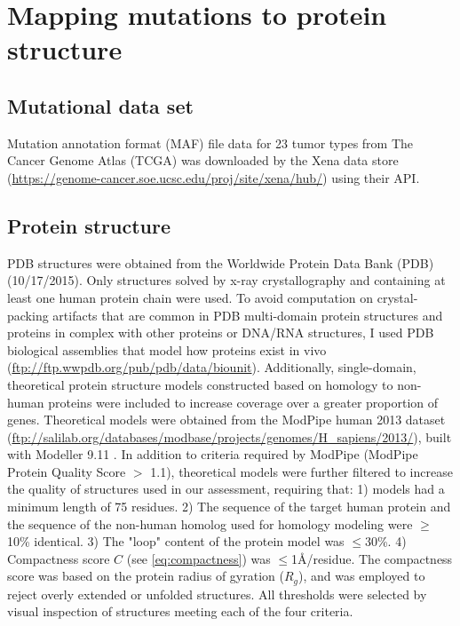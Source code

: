 \section{Mapping mutations to protein structure}

\subsection{Mutational data set}

Mutation annotation format (MAF) file data for 23 tumor types from The Cancer Genome Atlas (TCGA) was downloaded by the Xena data store (\url{https://genome-cancer.soe.ucsc.edu/proj/site/xena/hub/}) using their API.

\subsection{Protein structure}

PDB structures were obtained from the Worldwide Protein Data Bank (PDB) (10/17/2015). Only structures solved by x-ray crystallography and containing at least one human protein chain were used.  To avoid computation on crystal-packing artifacts that are common in PDB multi-domain protein structures and proteins in complex with other proteins or DNA/RNA structures, I used PDB biological assemblies that model how proteins exist in vivo (\url{ftp://ftp.wwpdb.org/pub/pdb/data/biounit}). Additionally, single-domain, theoretical protein structure models constructed based on homology to non-human proteins were included to increase coverage over a greater proportion of genes. Theoretical models were obtained from the ModPipe human 2013 dataset (\url{ftp://salilab.org/databases/modbase/projects/genomes/H_sapiens/2013/}), built with Modeller 9.11 \cite{RN119}.   In addition to criteria required by ModPipe (ModPipe Protein Quality Score $>$ 1.1), theoretical models were further filtered to increase the quality of structures used in our assessment, requiring that: 1) models had a minimum length of 75 residues. 2) The sequence of the target human protein and the sequence of the non-human homolog used for homology modeling were $\geq$10\% identical. 3) The "loop" content of the protein model was $\leq$30\%. 4) Compactness score $C$ (see \autoref{eq:compactness}) was $\leq$1\AA/residue. The compactness score was based on the protein radius of gyration ($R_g$), and was employed to reject overly extended or unfolded structures. All thresholds were selected by visual inspection of structures meeting each of the four criteria.

